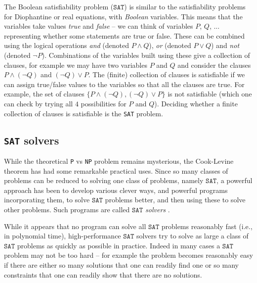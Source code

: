 \documentclass{amsart}
\theoremstyle{plain}
\theoremstyle{definition}
\theoremstyle{remark}
\begin{document}
The Boolean satisfiability problem (\(\texttt{SAT}\)) is similar to the satisfiability
problems for Diophantine or real equations, with \emph{Boolean} variables.
This means that the variables take values \emph{true} and \emph{false} -- we
can think of variables $P$, $Q$, ... representing whether some statements are
true or false. These can be combined using the logical operations \emph{and}
(denoted $P\wedge Q$), \emph{or} (denoted $P\vee Q$) and \emph{not} (denoted $\neg P$).
Combinations of the variables built using these give a collection of clauses, for example we
may have two variables $P$ and $Q$ and consider the clauses $P\wedge(\neg Q)$ and $(\neg Q)\vee P$.
The (finite) collection of clauses is satisfiable if we can assign true/false values to the variables
so that all the clauses are true. For example, the set of clauses $\{P\wedge(\neg Q), (\neg Q)\vee P\}$
is not satisfiable (which one can check by trying all $4$ possibilities for $P$ and $Q$).
Deciding whether a finite collection of clauses is satisfiable is
the \texttt{SAT} problem.

\hypertarget{sat-solvers}{%
	\subsection{\texttt{SAT} solvers}\label{sat-solvers}}

While the theoretical \texttt{P} vs \texttt{NP} problem remains mysterious, the
Cook-Levine theorem has had some remarkable practical uses. Since so
many classes of problems can be reduced to solving one class of
problems, namely \(\texttt{SAT}\), a powerful approach has been to develop
various clever ways, and powerful programs incorporating them, to solve
\(\texttt{SAT}\) problems better, and then using these to solve other problems.
Such programs are called \emph{\(\texttt{SAT}\) solvers} .


While it appears that no program can solve all \(\texttt{SAT}\) problems
reasonably fast (i.e., in polynomial time), high-performance \(\texttt{SAT}\)
solvers try to solve as large a class of \(\texttt{SAT}\) problems as quickly as
possible in practice. Indeed in many cases a \(\texttt{SAT}\) problem may not be too
hard -- for example the problem becomes reasonably easy if there are either so
many solutions that one can readily find one or so many constraints that
one can readily show that there are no solutions.
\end{document}
